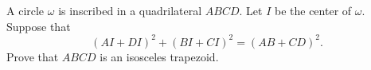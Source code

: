 A circle $\omega$ is inscribed in a quadrilateral $ABCD$. Let $I$ be the center of $\omega$. Suppose that \[
(AI + DI)^2 + (BI + CI)^2 = (AB + CD)^2.
\] Prove that $ABCD$ is an isosceles trapezoid.
